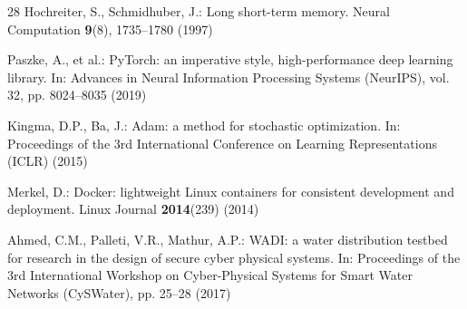 \documentclass[runningheads]{llncs}
\begin{document}
\begin{thebibliography}{28}
Hochreiter, S., Schmidhuber, J.: Long short-term memory. Neural Computation
\textbf{9}(8), 1735--1780 (1997)

Paszke, A., et al.: PyTorch: an imperative style, high-performance deep
learning library. In: Advances in Neural Information Processing Systems
(NeurIPS), vol. 32, pp. 8024--8035 (2019)

Kingma, D.P., Ba, J.: Adam: a method for stochastic optimization. In:
Proceedings of the 3rd International Conference on Learning Representations
(ICLR) (2015)

Merkel, D.: Docker: lightweight Linux containers for consistent development and
deployment. Linux Journal \textbf{2014}(239) (2014)

Ahmed, C.M., Palleti, V.R., Mathur, A.P.: WADI: a water distribution testbed for
research in the design of secure cyber physical systems. In: Proceedings of the
3rd International Workshop on Cyber-Physical Systems for Smart Water Networks
(CySWater), pp. 25--28 (2017)

\end{thebibliography}
\end{document}
